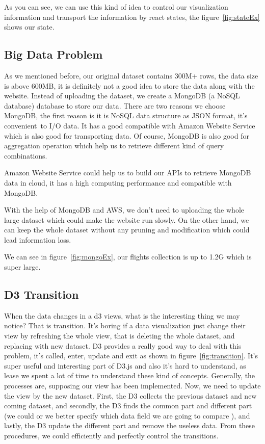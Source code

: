 As you can see, we can use this kind of idea to control our visualization information and transport the information by react states, the figure~\ref{fig:stateEx} shows our state. 
\stateEx



\subsection{Big Data Problem}

As we mentioned before, our original dataset contains 300M+ rows, the data size is above 600MB, it is definitely not a good idea to store the data along with the website. Instead of uploading the dataset, we create a MongoDB (a NoSQL database) database to store our data. There are two reasons we choose MongoDB\cite{boicea2012mongodb}, the first reason is it is NoSQL data structure as JSON format, it's convenient to I/O data. It has a good compatible with Amazon Website Service which is also good for transporting data. Of course, MongoDB is also good for aggregation operation which help us to retrieve different kind of query combinations. \cite{keim2013big}

Amazon Website Service could help us to build our APIs to retrieve MongoDB data in cloud, it has a high computing performance and compatible with MongoDB\cite{jackson2010performance}.

With the help of MongoDB and AWS, we don't need to uploading the whole large dataset which could make the website run slowly. On the other hand, we can keep the whole dataset without any pruning and modification which could lead information loss.

We can see in figure~\ref{fig:mongoEx}, our flights collection is up to 1.2G which is super large.
\mongodbEx

\subsection{D3 Transition}
When the data changes in a d3 views, what is the interesting thing we may notice? That is transition. It's boring if a data visualization just change their view by refreshing the whole view, that is deleting the whole dataset, and replacing with new dataset. D3 provides a really good way to deal with this problem, it's called, enter, update and exit as shown in figure~\ref{fig:transition}. It's super useful and interesting part of D3.js and also it's hard to understand, as lease we spent a lot of time to understand these kind of concepts. Generally, the processes are, supposing our view has been implemented. Now, we need to update the view by the new dataset. First, the D3 collects the previous dataset and new coming dataset, and secondly, the D3 finds the common part and different part (we could or we better specify which data field we are going to compare ), and lastly, the D3 update the different part and remove the useless data. From these procedures, we could efficiently and perfectly control the transitions.\cite{buja1991interactive}  
\transition

